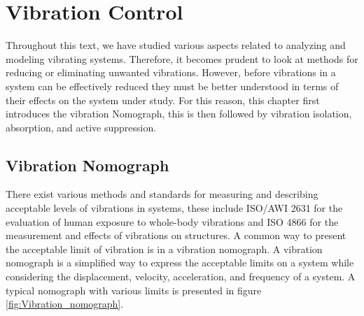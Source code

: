 \documentclass[12pt,letter]{article}
\numberwithin{ex}{section} %
\numberwithin{re}{section} %
\begin{document}
\setcounter{section}{5}	
\section{Vibration Control}

Throughout this text, we have studied various aspects related to analyzing and modeling vibrating systems. Therefore, it becomes prudent to look at methods for reducing or eliminating unwanted vibrations. However, before vibrations in a system can be effectively reduced they must be better understood in terms of their effects on the system under study. For this reason, this chapter first introduces the vibration Nomograph, this is then followed by vibration isolation, absorption, and active suppression.  

\subsection{Vibration Nomograph}

There exist various methods and standards for measuring and describing acceptable levels of vibrations in systems, these include ISO/AWI 2631 for the evaluation of human exposure to whole-body vibrations and ISO 4866 for the measurement and effects of vibrations on structures. A common way to present the acceptable limit of vibration is in a vibration nomograph.  A vibration nomograph is a simplified way to express the acceptable limits on a system while considering the displacement, velocity, acceleration, and frequency of a system. A typical nomograph with various limits is presented in figure \ref{fig:Vibration_nomograph}. 
\end{document}
